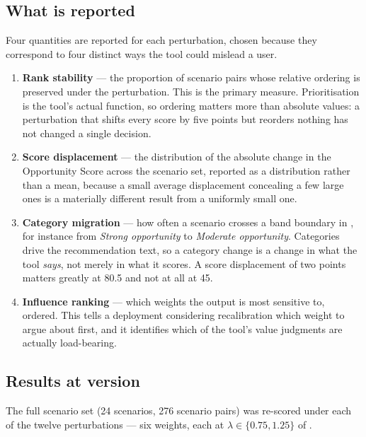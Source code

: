 \subsection{What is reported}
\label{sec:sa-reported}

Four quantities are reported for each perturbation, chosen because they
correspond to four distinct ways the tool could mislead a user.

\begin{enumerate}
  \item \textbf{Rank stability} --- the proportion of scenario pairs whose
  relative ordering is preserved under the perturbation. This is the primary
  measure. Prioritisation is the tool's actual function, so ordering matters
  more than absolute values: a perturbation that shifts every score by five
  points but reorders nothing has not changed a single decision.

  \item \textbf{Score displacement} --- the distribution of the absolute change
  in the Opportunity Score across the scenario set, reported as a distribution
  rather than a mean, because a small average displacement concealing a few
  large ones is a materially different result from a uniformly small one.

  \item \textbf{Category migration} --- how often a scenario crosses a band
  boundary in , for instance from \emph{Strong
  opportunity} to \emph{Moderate opportunity}. Categories drive the
  recommendation text, so a category change is a change in what the tool
  \emph{says}, not merely in what it scores. A score displacement of two points
  matters greatly at 80.5 and not at all at 45.

  \item \textbf{Influence ranking} --- which weights the output is most
  sensitive to, ordered. This tells a deployment considering recalibration
  which weight to argue about first, and it identifies which of the tool's
  value judgments are actually load-bearing.
\end{enumerate}

\subsection{Results at version \methver{}}
\label{sec:sensitivity-results}

The full scenario set (\num{24} scenarios, \num{276} scenario pairs) was
re-scored under each of the twelve perturbations --- six weights, each at
$\lambda \in \{0.75, 1.25\}$ of .

